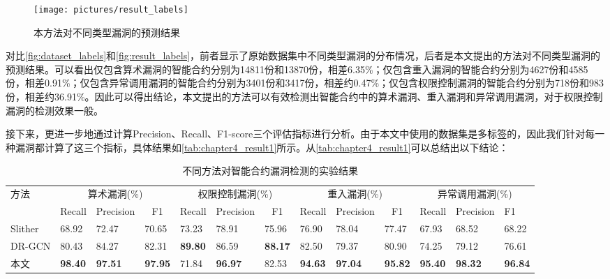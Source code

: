\begin{figure}[htbp]
    \centering
    \texttt{[image: pictures/result\_labels]}
    \caption{\label{fig:result_labels}本方法对不同类型漏洞的预测结果}
\end{figure}
对比\autoref{fig:dataset_labels}和\autoref{fig:result_labels}，前者显示了原始数据集中不同类型漏洞的分布情况，后者是本文提出的方法对不同类型漏洞的预测结果。可以看出仅包含算术漏洞的智能合约分别为14811份和13870份，相差6.35\%；仅包含重入漏洞的智能合约分别为4627份和4585份，相差0.91\%；仅包含异常调用漏洞的智能合约分别为3401份和3417份，相差约0.47\%；仅包含权限控制漏洞的智能合约分别为718份和983份，相差约36.91\%。因此可以得出结论，本文提出的方法可以有效检测出智能合约中的算术漏洞、重入漏洞和异常调用漏洞，对于权限控制漏洞的检测效果一般。

接下来，更进一步地通过计算Precision、Recall、F1-score三个评估指标进行分析。由于本文中使用的数据集是多标签的，因此我们针对每一种漏洞都计算了这三个指标，具体结果如\autoref{tab:chapter4_result1}所示。从\autoref{tab:chapter4_result1}可以总结出以下结论：

\begin{table}[htbp]
    \caption{\label{tab:chapter4_result1}不同方法对智能合约漏洞检测的实验结果}
    \fontsize{8pt}{10pt}\selectfont
    \renewcommand{\arraystretch}{1.5}
    \begin{tabularx}{\linewidth}{p{1.3cm}|X<{\centering}X<{\centering}X<{\centering}|X<{\centering}X<{\centering}X<{\centering}|X<{\centering}X<{\centering}X<{\centering}|X<{\centering}X<{\centering}X<{\centering}}
        \hline
        \multirow{2}{*}{方法} & \multicolumn{3}{c|}{算术漏洞(\%)} & \multicolumn{3}{c|}{权限控制漏洞(\%)} & \multicolumn{3}{c|}{重入漏洞(\%)} & \multicolumn{3}{c}{异常调用漏洞(\%)} \\ \cline{2-13} 
                            & {Recall} & {Precision} & \multicolumn{1}{c|}{F1} & {Recall} & {Precision} & \multicolumn{1}{c|}{F1} & {Recall} & {Precision} & \multicolumn{1}{c|}{F1} & {Recall} & {Precision} & {F1} \\ \hline
        Slither & 68.92 & 72.47 & 70.65       & 73.23 & 78.91 & 75.96       & 76.90 & 78.04 & 77.47       & 67.93 & 68.52 & 68.22      \\
        DR-GCN & 80.43 & 84.27 & 82.31       & \textbf{89.80} & 86.59 & \textbf{88.17} & 82.50 & 79.37 & 80.90       & 74.25 & 79.12 & 76.61      \\
        本文      & \textbf{98.40} & \textbf{97.51}    & \textbf{97.95} & 71.84 & \textbf{96.97}    & 82.53       & \textbf{94.63} & \textbf{97.04}    & \textbf{95.82} & \textbf{95.40} & \textbf{98.32}    & \textbf{96.84}         \\ \hline
        \end{tabularx}
\end{table}

